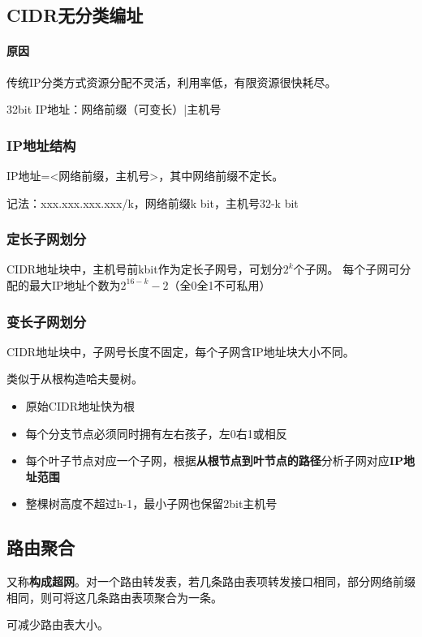 \subsection{CIDR无分类编址}

\paragraph{原因}
传统IP分类方式资源分配不灵活，利用率低，有限资源很快耗尽。

32bit IP地址：网络前缀（可变长）|主机号


\subsubsection{IP地址结构}
IP地址=<网络前缀，主机号>，其中网络前缀不定长。

记法：xxx.xxx.xxx.xxx/k，网络前缀k bit，主机号32-k bit



\subsubsection{定长子网划分}
CIDR地址块中，主机号前kbit作为定长子网号，可划分\(2^k\)个子网。
每个子网可分配的最大IP地址个数为\(2^{16 - k} - 2\)（全0全1不可私用）


\subsubsection{变长子网划分}
CIDR地址块中，子网号长度不固定，每个子网含IP地址块大小不同。

类似于从根构造哈夫曼树。\begin{itemize}
    \item 原始CIDR地址快为根
    \item 每个分支节点必须同时拥有左右孩子，左0右1或相反
    \item 每个叶子节点对应一个子网，根据\textbf{从根节点到叶节点的路径}分析子网对应\textbf{IP地址范围}
    \item 整棵树高度不超过h-1，最小子网也保留2bit主机号
\end{itemize}


\subsection{路由聚合}
又称\textbf{构成超网}。对一个路由转发表，若几条路由表项转发接口相同，部分网络前缀相同，则可将这几条路由表项聚合为一条。

可减少路由表大小。

